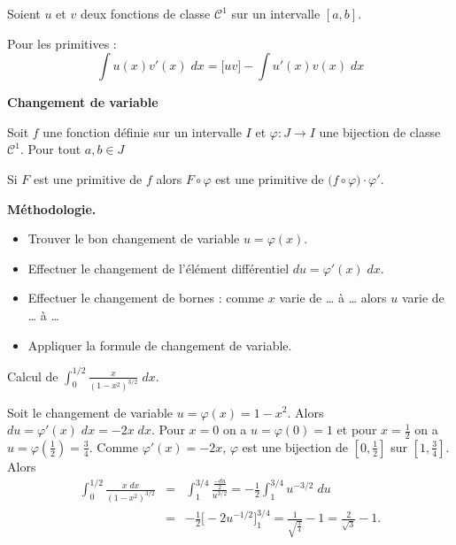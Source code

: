 \documentclass[10pt,class=article,crop=false]{standalone}
\begin{document}
\begin{multicols}{2}
\begin{theoreme}
	Soient $u$ et $v$ deux fonctions de classe $\mathcal{C}^1$ sur un intervalle $[a,b]$.
\end{theoreme}

Pour les primitives :
$$\int u(x)v'(x)\;dx= \big[uv\big] - \int u'(x)v(x)\;dx$$

\textbf{Changement de variable}
\begin{theoreme}
	Soit $f$ une fonction définie sur un intervalle $I$ et $\varphi : J \to I$ une bijection de classe $\mathcal{C}^1$.
	Pour tout $a,b\in J$
	
	Si $F$ est une primitive de $f$ alors $F\circ \varphi$ est une primitive de
	$\big(f \circ \varphi\big)\cdot\varphi'$.
\end{theoreme}

\textbf{Méthodologie.}
\begin{itemize}
	\item Trouver le bon changement de variable $u =\varphi(x)$.
	\item Effectuer le changement de l'élément différentiel $du = \varphi'(x) \; dx$.
	\item Effectuer le changement de bornes : comme $x$ varie de \ldots{} à \ldots{} alors $u$ varie de \ldots{} à \ldots{}
	\item Appliquer la formule de changement de variable.
\end{itemize}
	
\begin{exemple}
	Calcul de $\int_0^{1/2}\frac{x}{(1-x^2)^{3/2}} \;dx$.
	
	Soit le changement de variable $u=\varphi(x) = 1-x^2$. Alors $du = \varphi'(x) \; dx = -2x \; dx$.
	Pour $x=0$ on a $u=\varphi(0)=1$ et pour $x=\frac12$ on a $u=\varphi(\frac{1}{2})=\frac34$.
	Comme $\varphi'(x)=-2x$, $\varphi$ est une bijection de $[0,\frac{1}{2}]$ sur $[1,\frac{3}{4}]$. Alors
	\begin{eqnarray*}
		\int_0^{1/2}\frac{x \; dx}{(1-x^2)^{3/2}} 
		&=& \int_1^{3/4} \frac{\frac{-du}{2}}{u^{3/2}}
		= -\frac12\int_1^{3/4} u^{-3/2}\;du \\
		&=& -\frac12\big[-2u^{-1/2}\big]_1^{3/4}
		= \frac1{\sqrt{\frac34}}-1= \frac{2}{\sqrt3}-1.
	\end{eqnarray*}
\end{exemple}



\end{multicols}
\end{document}
